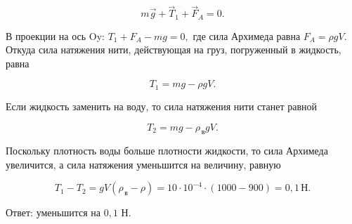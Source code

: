 \documentclass[12pt,a4paper]{article}
\begin{document}
{\[m\vec g + \vec T_1 + \vec F_A=0.\]

В проекции на ось Oy: $T_1 + F_A - mg=0,$ где сила Архимеда равна $F_A=\rho gV.$ Откуда сила натяжения нити, действующая на груз, погруженный в жидкость, равна

\[T_1=mg - \rho gV.\]

Если  жидкость заменить на воду, то сила натяжения нити станет равной

\[T_2=mg - \rho_{\,\text{в}} gV.\]

Поскольку плотность воды  больше плотности жидкости, то сила Архимеда увеличится, а сила натяжения уменьшится на величину, равную

\[T_1 - T_2=gV ( \rho_{\,\text{в}} - \rho ) =10 \cdot 10 ^{ - 4 } \cdot ( 1000 - 900 ) =0{,}1\,\text{Н}.\]

Ответ: уменьшится на $0{,}1$ Н.
}
\end{document}
